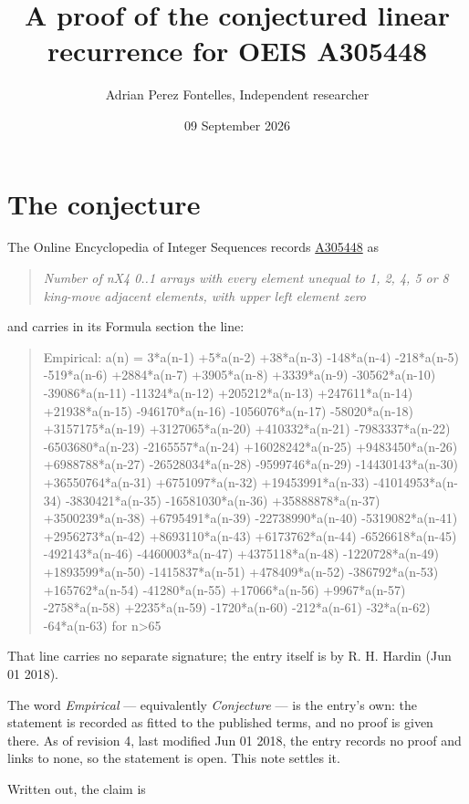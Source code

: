 \documentclass[11pt]{article}
\title{A proof of the conjectured linear recurrence for OEIS A305448}
\author{Adrian Perez Fontelles, Independent researcher}
\date{09 September 2026}
\theoremstyle{definition}
\begin{document}
\maketitle
\section{The conjecture}

The Online Encyclopedia of Integer Sequences records \href{https://oeis.org/A305448}{A305448} as

\begin{quote}\itshape Number of nX4 0..1 arrays with every element unequal to 1, 2, 4, 5 or 8 king-move adjacent elements, with upper left element zero\end{quote}

and carries in its Formula section the line:

\begin{quote}\ttfamily Empirical: a(n) = 3*a(n-1) +5*a(n-2) +38*a(n-3) -148*a(n-4) -218*a(n-5) -519*a(n-6) +2884*a(n-7) +3905*a(n-8) +3339*a(n-9) -30562*a(n-10) -39086*a(n-11) -11324*a(n-12) +205212*a(n-13) +247611*a(n-14) +21938*a(n-15) -946170*a(n-16) -1056076*a(n-17) -58020*a(n-18) +3157175*a(n-19) +3127065*a(n-20) +410332*a(n-21) -7983337*a(n-22) -6503680*a(n-23) -2165557*a(n-24) +16028242*a(n-25) +9483450*a(n-26) +6988788*a(n-27) -26528034*a(n-28) -9599746*a(n-29) -14430143*a(n-30) +36550764*a(n-31) +6751097*a(n-32) +19453991*a(n-33) -41014953*a(n-34) -3830421*a(n-35) -16581030*a(n-36) +35888878*a(n-37) +3500239*a(n-38) +6795491*a(n-39) -22738990*a(n-40) -5319082*a(n-41) +2956273*a(n-42) +8693110*a(n-43) +6173762*a(n-44) -6526618*a(n-45) -492143*a(n-46) -4460003*a(n-47) +4375118*a(n-48) -1220728*a(n-49) +1893599*a(n-50) -1415837*a(n-51) +478409*a(n-52) -386792*a(n-53) +165762*a(n-54) -41280*a(n-55) +17066*a(n-56) +9967*a(n-57) -2758*a(n-58) +2235*a(n-59) -1720*a(n-60) -212*a(n-61) -32*a(n-62) -64*a(n-63) for n>65\end{quote}

That line carries no separate signature; the entry itself is by R. H. Hardin (Jun 01 2018).

The word {\itshape Empirical} --- equivalently {\itshape Conjecture} --- is the entry's own: the statement is recorded as fitted to the published terms, and no proof is given there. As of revision 4, last modified Jun 01 2018, the entry records no proof and links to none, so the statement is open. This note settles it.

Written out, the claim is
\end{document}
